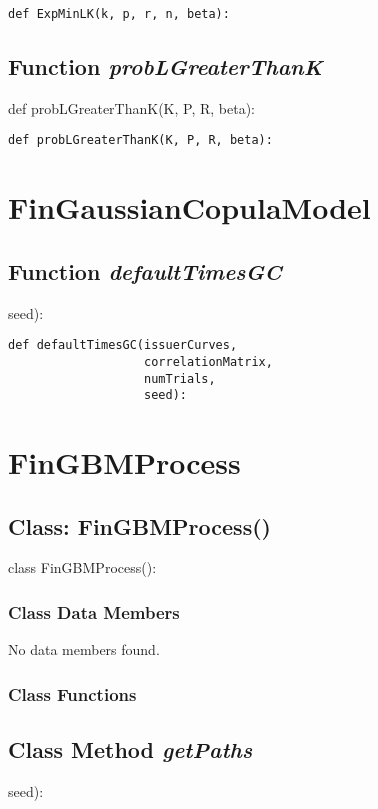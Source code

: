 \documentclass[twoside,11pt]{book}
\begin{document}
\begin{lstlisting}
def ExpMinLK(k, p, r, n, beta):
\end{lstlisting}

\subsection{Function {\it probLGreaterThanK}}
def probLGreaterThanK(K, P, R, beta):

\begin{lstlisting}
def probLGreaterThanK(K, P, R, beta):
\end{lstlisting}

\newpage
\section{FinGaussianCopulaModel}

\subsection{Function {\it defaultTimesGC}}
seed):

\begin{lstlisting}
def defaultTimesGC(issuerCurves,
                   correlationMatrix,
                   numTrials,
                   seed):
\end{lstlisting}

\newpage
\section{FinGBMProcess}

\subsection{Class: FinGBMProcess()}
class FinGBMProcess():

\subsubsection{Class Data Members}
No data members found.

\subsubsection{Class Functions}

\subsection{Class Method {\it getPaths}}
seed):
\end{document}
